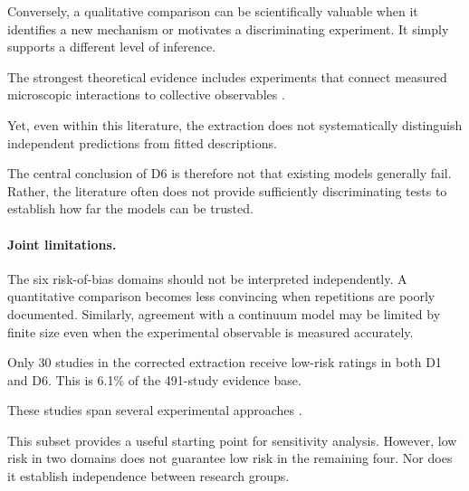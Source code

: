 Conversely, a qualitative comparison
can be scientifically valuable
when it identifies a new mechanism
or motivates a discriminating
experiment. It simply supports
a different level of inference.

The strongest theoretical evidence
includes experiments that connect
measured microscopic interactions
to collective observables
\cite{Buerle2020formationofstable,Xiao2023perceptionofmotion,Arbel2025amechanicalroutef,Heuthe2025tunablecolloidalsw,Boudet2025nonmarkoviandynami,Chen2024persistentandrespo,Chvykov2020lowrattlingapred,Wang2025hyperuniformnetwork,Zion2023morphologicalcomput,Binysh2026moreislessinunpe}.

Yet, even within this literature,
the extraction does not systematically
distinguish independent predictions
from fitted descriptions.

The central conclusion of D6 is
therefore not that existing
models generally fail.
Rather, the literature often
does not provide sufficiently
discriminating tests to
establish how far the
models can be trusted.

\paragraph*{Joint limitations.}

The six risk-of-bias domains should
not be interpreted independently.
A quantitative comparison becomes
less convincing when repetitions
are poorly documented.
Similarly, agreement with a
continuum model may be limited
by finite size even when
the experimental observable
is measured accurately.

Only 30 studies in the corrected
extraction receive low-risk
ratings in both D1 and D6.
This is 6.1\% of the
491-study evidence base.

These studies span several
experimental approaches
\cite{Garnier2005aggregationbehaviou,Buerle2020formationofstable,Yang2022emergentmicroroboti,Xiao2023perceptionofmotion,Arbel2025amechanicalroutef,Heuthe2025tunablecolloidalsw,Boudet2025nonmarkoviandynami,Casiulis2025ageometricconditio,Chen2024persistentandrespo,Chvykov2020lowrattlingapred,Savoie2019arobotmadeofrobo,Wang2025hyperuniformnetwork,Zion2023morphologicalcomput,Li2020programmingactiveg}.

This subset provides a useful starting
point for sensitivity analysis.
However, low risk in two domains
does not guarantee low risk
in the remaining four.
Nor does it establish
independence between
research groups.

